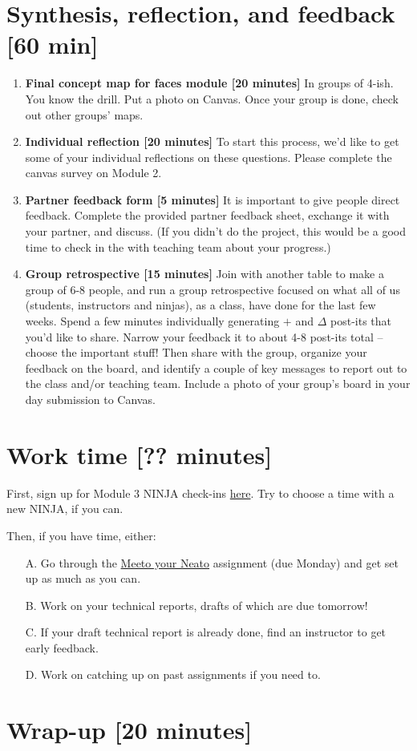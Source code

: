 \section{Synthesis, reflection, and feedback [60 min]}
\begin{enumerate}
\item \textbf{Final concept map for faces module [20 minutes]} In groups of 4-ish. You know the drill. Put a photo on Canvas. Once your group is done, check out other groups' maps.
\item \textbf{Individual reflection [20 minutes]} To start this process, we'd like to get some of your individual reflections on these questions.  Please complete the canvas survey on Module 2.
\item \textbf{Partner feedback form [5 minutes]} It is important to give people direct feedback.  Complete the provided partner feedback sheet, exchange it with your partner, and discuss. (If you didn't do the project, this would be a good time to check in the with teaching team about your progress.)
\item \textbf{Group retrospective [15 minutes]} Join with another table to make a group of 6-8 people, and run a group retrospective focused on what all of us (students, instructors and ninjas), as a class, have done for the last few weeks.  Spend a few minutes individually generating $+$ and $\Delta$ post-its that you'd like to share.  Narrow your feedback it to about 4-8 post-its total -- choose the important stuff! Then share with the group, organize your feedback on the board, and identify a couple of key messages to report out to the class and/or teaching team. Include a photo of your group's board in your day submission to Canvas.

\end{enumerate}

\section{Work time [?? minutes]}

First, sign up for  Module 3 NINJA check-ins \href{https://docs.google.com/spreadsheets/d/1vkMsrGzSqdBcEwj7fxO2WKl0Nr5Fm_EwxTAZLefAkxc/edit#gid=1131009963}{here}. Try to choose a time with a new NINJA, if you can.


Then, if you have time, either:

\begin{enumerate}
\item [A.] Go through the \href{https://docs.google.com/document/d/1zXXR0NJCqJshj_Dj2zSO54iw1vb4ec5UsukpeGv5jE8/}{Meeto your Neato} assignment (due Monday) and get set up as much as you can.
\item [B.] Work on your technical reports, drafts of which are due tomorrow!
\item [C.] If your draft technical report is already done, find an instructor to get early feedback.
\item [D.] Work on catching up on past assignments if you need to.
\end{enumerate}

\section{Wrap-up [20 minutes]}
